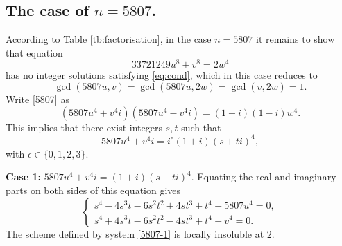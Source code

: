 \documentclass[a4paper,12pt,english,reqno]{amsart}
\begin{document}
%
%
%




\subsection{The case of $n=5807$.}%
According to Table \ref{tb:factorisation}, in the case $n=5807$ it remains to
show that equation
\begin{equation}\label{5807}
33721249 u^8+v^8=2  w^4
\end{equation}
has no integer solutions satisfying \eqref{eq:cond}, which in this case reduces to \[\gcd(5807u,v)=\gcd(5807u,2w)=\gcd(v,2w)=1.\] 
Write \eqref{5807} as
\begin{equation} (5807u^4+v^4i)(5807u^4-v^4i)=(1+i)(1-i)w^4.
\end{equation}
This implies that there exist integers $s,t$ such that
\[5807u^4+v^4i=i^{\epsilon}(1+i)(s+ti)^4,\]
with $\epsilon \in \{0,1,2,3\}$.


{\bf Case 1:} $5807u^4+v^4i=(1+i)(s+ti)^4$. Equating the real and imaginary parts on both sides of this equation gives
\begin{equation}\label{5807-1}
\begin{cases}
s^4 - 4s^3t - 6s^2t^2 + 4st^3 + t^4 - 5807u^4=0,\\
s^4 + 4s^3t - 6s^2t^2 - 4st^3 + t^4 - v^4=0.
\end{cases}
\end{equation}
The scheme defined by system \eqref{5807-1} is locally insoluble at $2$.
\end{document}

